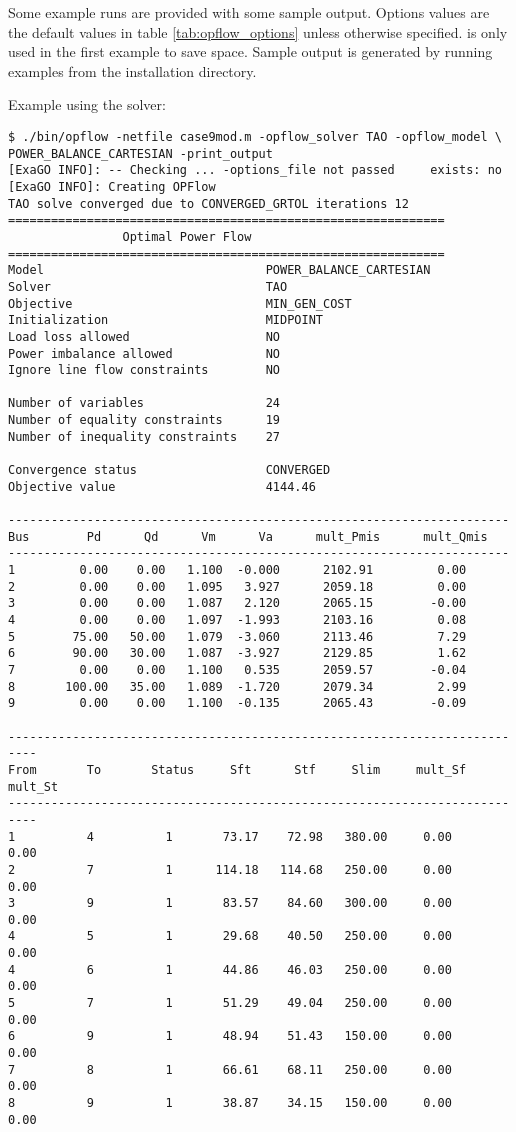 Some \opflow example runs are provided with some sample output. Options values are the default values in table \ref{tab:opflow_options} unless otherwise specified.  is only used in the first example to save space. Sample output is generated by running examples from the installation directory.

Example using the \tao solver:

\begin{lstlisting}
$ ./bin/opflow -netfile case9mod.m -opflow_solver TAO -opflow_model \
POWER_BALANCE_CARTESIAN -print_output
[ExaGO INFO]: -- Checking ... -options_file not passed     exists: no
[ExaGO INFO]: Creating OPFlow
TAO solve converged due to CONVERGED_GRTOL iterations 12
=============================================================
                Optimal Power Flow
=============================================================
Model                               POWER_BALANCE_CARTESIAN
Solver                              TAO
Objective                           MIN_GEN_COST
Initialization                      MIDPOINT
Load loss allowed                   NO
Power imbalance allowed             NO
Ignore line flow constraints        NO

Number of variables                 24
Number of equality constraints      19
Number of inequality constraints    27

Convergence status                  CONVERGED
Objective value                     4144.46

----------------------------------------------------------------------
Bus        Pd      Qd      Vm      Va      mult_Pmis      mult_Qmis
----------------------------------------------------------------------
1         0.00    0.00   1.100  -0.000      2102.91         0.00
2         0.00    0.00   1.095   3.927      2059.18         0.00
3         0.00    0.00   1.087   2.120      2065.15        -0.00
4         0.00    0.00   1.097  -1.993      2103.16         0.08
5        75.00   50.00   1.079  -3.060      2113.46         7.29
6        90.00   30.00   1.087  -3.927      2129.85         1.62
7         0.00    0.00   1.100   0.535      2059.57        -0.04
8       100.00   35.00   1.089  -1.720      2079.34         2.99
9         0.00    0.00   1.100  -0.135      2065.43        -0.09

--------------------------------------------------------------------------
From       To       Status     Sft      Stf     Slim     mult_Sf  mult_St
--------------------------------------------------------------------------
1          4          1       73.17    72.98   380.00     0.00     0.00
2          7          1      114.18   114.68   250.00     0.00     0.00
3          9          1       83.57    84.60   300.00     0.00     0.00
4          5          1       29.68    40.50   250.00     0.00     0.00
4          6          1       44.86    46.03   250.00     0.00     0.00
5          7          1       51.29    49.04   250.00     0.00     0.00
6          9          1       48.94    51.43   150.00     0.00     0.00
7          8          1       66.61    68.11   250.00     0.00     0.00
8          9          1       38.87    34.15   150.00     0.00     0.00


\end{lstlisting}
